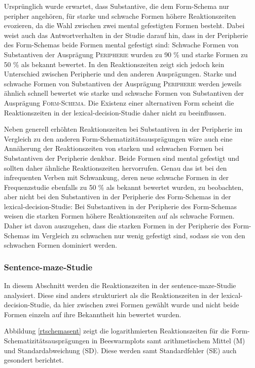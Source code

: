Ursprünglich wurde erwartet, dass Substantive, die dem Form-Schema nur peripher angehören, für starke und schwache Formen höhere Reaktionszeiten evozieren, da die Wahl zwischen zwei mental gefestigten Formen besteht. Dabei weist auch das Antwortverhalten in der Studie darauf hin, dass in der Peripherie des Form-Schemas beide Formen mental gefestigt sind: Schwache Formen von Substantiven der Ausprägung \textsc{Peripherie} wurden zu 90 \% und starke Formen zu 50 \% als bekannt bewertet. In den Reaktionszeiten zeigt sich jedoch kein Unterschied zwischen Peripherie und den anderen Ausprägungen. Starke und schwache Formen von Substantiven der Ausprägung \textsc{Peripherie} werden jeweils ähnlich schnell bewertet wie starke und schwache Formen von Substantiven der Ausprägung \textsc{Form-Schema}. Die Existenz einer alternativen Form scheint die Reaktionszeiten in der lexical-decision-Studie daher nicht zu beeinflussen.



Neben generell erhöhten Reaktionszeiten bei Substantiven in der Peripherie im Vergleich zu den anderen Form-Sche\-ma\-ti\-zi\-täts\-aus\-prä\-gun\-gen wäre auch eine Annäherung der Reaktionszeiten von starken und schwachen Formen bei Substantiven der Peripherie denkbar. Beide Formen sind mental gefestigt und sollten daher ähnliche Reaktionszeiten hervorrufen. Genau das ist bei den infrequenten Verben mit Schwankung, deren neue schwache Formen in der Frequenzstudie ebenfalls zu 50 \% als bekannt bewertet wurden, zu beobachten, aber nicht bei den Substantiven in der Peripherie des Form-Schemas in der lexical-decision-Studie: Bei Substantiven in der Peripherie des Form-Schemas weisen die starken Formen höhere Reaktionszeiten auf als schwache Formen. Daher ist davon auszugehen, dass die starken Formen in der Peripherie des Form-Schemas im Vergleich zu schwachen nur wenig gefestigt sind, sodass sie von den schwachen Formen dominiert werden. 

\subsubsection{Sentence-maze-Studie}\largerpage

In diesem Abschnitt werden die Reaktionszeiten in der sentence-maze-Studie analysiert. Diese sind anders strukturiert als die Reaktionszeiten in der lex\-i\-cal-de\-ci\-sion-Stu\-die, da hier zwischen zwei Formen gewählt wurde und nicht beide Formen einzeln auf ihre Bekanntheit hin bewertet wurden. 


Abbildung \ref{rtschemasent} zeigt die logarithmierten Reaktionszeiten für die Form-Sche\-ma\-ti\-zi\-täts\-aus\-prä\-gun\-gen in Beeswarmplots samt arithmetischem Mittel (M) und Standardabweichung (SD). Diese werden samt Standardfehler (SE) auch gesondert berichtet. 


